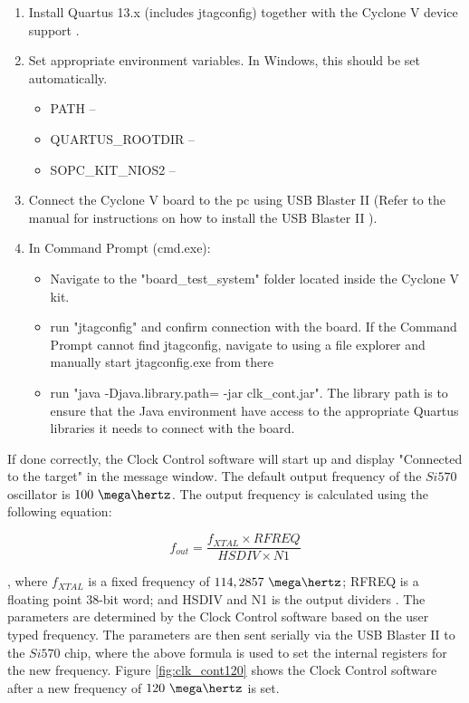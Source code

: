 \documentclass[main.tex]{subfiles}
\begin{document}
\begin{enumerate}\setlength{\itemsep}{10pt}
  \item Install Quartus 13.x (includes jtagconfig) together with the Cyclone V device support \cite{altera_q13}.
  \item Set appropriate environment variables. In Windows, this should be set automatically.
  \begin{itemize}\setlength{\itemsep}{10pt}
      \item PATH -- 
      \item QUARTUS\_ROOTDIR -- 
      \item SOPC\_KIT\_NIOS2 -- 
    \end{itemize}
  \item Connect the Cyclone V board to the \gls{pc} using USB Blaster II (Refer to the manual for instructions on how to install the USB Blaster II \cite{altera_usb}).
  \item In Command Prompt (cmd.exe):
  \begin{itemize}\setlength{\itemsep}{10pt}
      \item Navigate to the "board\_test\_system" folder located inside the Cyclone V kit.
      \item run "jtagconfig" and confirm connection with the board. If the Command Prompt cannot find jtagconfig, navigate to  using a file explorer and manually start jtagconfig.exe from there
      \item run "java -Djava.library.path= -jar clk\_cont.jar". The library path is to ensure that the Java environment have access to the appropriate Quartus libraries it needs to connect with the board.
    \end{itemize}
\end{enumerate}

If done correctly, the Clock Control software will start up and display "Connected to the target" in the message window. The default output frequency of the $Si570$ oscillator is $100~\mega\hertz$. The output frequency is calculated using the following equation:

\begin{equation}
    f_{out} = \frac{f_{XTAL} \times RFREQ}{HSDIV \times N1}
\end{equation} 

, where $f_{XTAL}$ is a fixed frequency of $114,2857~\mega\hertz$; RFREQ is a floating point 38-bit word; and HSDIV and N1 is the output dividers \cite{si570}. The parameters are determined by the Clock Control software based on the user typed frequency. The parameters are then sent serially via the USB Blaster II to the $Si570$ chip, where the above formula is used to set the internal registers for the new frequency.
Figure \ref{fig:clk_cont120} shows the Clock Control software after a new frequency of $120~\mega\hertz$ is set. 
\end{document}
